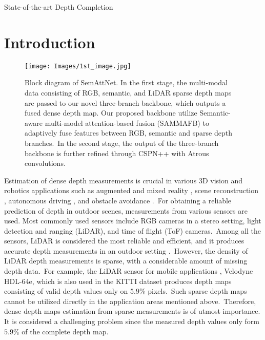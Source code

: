 \documentclass{ieeeaccess}
\begin{document}
\begin{keywords}
State-of-the-art Depth Completion
\end{keywords}

\titlepgskip=-15pt

\maketitle

\section{Introduction}
\label{sec:introduction}
\begin{figure}
\begin{center}
    \texttt{[image: Images/1st\_image.jpg]} 
\end{center}
\caption{Block diagram of SemAttNet. In the first stage, the multi-modal data consisting of RGB, semantic, and LiDAR sparse depth maps are passed to our novel three-branch backbone, which outputs a fused dense depth map. Our proposed backbone utilize Semantic-aware multi-model attention-based fusion (SAMMAFB) to adaptively fuse features between RGB, semantic and sparse depth branches.~In the second stage, the output of the three-branch backbone is further refined through CSPN++ with Atrous convolutions. }
\label{figure1}
\end{figure}
Estimation of dense depth measurements is crucial in various 3D vision and robotics applications such as augmented and mixed reality  \cite{holynski2018fast, augmented_app},  scene reconstruction  \cite{3DReconstruction, park2020non}, autonomous driving \cite{DepthNet, fisheyeautonomous}, and obstacle avoidance \cite{obstacle_avoid, tang2020learning}.~For obtaining a reliable prediction of depth in outdoor scenes, measurements from various sensors are used. Most commonly used sensors include RGB cameras in a stereo setting, light detection and ranging (LiDAR), and time of flight (ToF) cameras\cite{tof}.~Among all the sensors, LiDAR is considered the most reliable and efficient, and it produces accurate depth measurements in an outdoor setting \cite{tang2020learning}.~However, the density of LiDAR depth measurements is sparse, with a considerable amount of missing depth data\cite{KITTI, kitti_2}.~For example, the LiDAR sensor for mobile applications \cite{tang2020learning}, Velodyne HDL-64e, which is also used in the KITTI \cite{KITTI, kitti_2} dataset produces depth maps consisting of valid depth values only on $5.9 \%$ pixels.~Such sparse depth maps cannot be utilized directly in the application areas mentioned above.~Therefore, dense depth maps estimation from sparse measurements is of utmost importance. It is considered a challenging problem since the measured depth values only form $5.9 \%$ of the complete depth map.
\end{document}
